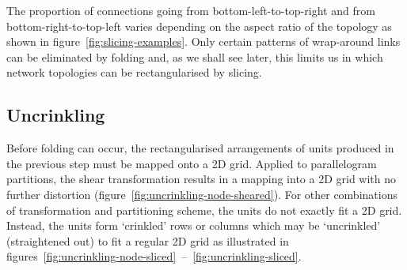 			The proportion of connections going from bottom-left-to-top-right and
			from bottom-right-to-top-left varies depending on the aspect ratio of the
			topology as shown in figure~\ref{fig:slicing-examples}. Only certain
			patterns of wrap-around links can be eliminated by folding and, as we
			shall see later, this limits us in which network topologies can be
			rectangularised by slicing.
			
		\subsection{Uncrinkling}
			
			Before folding can occur, the rectangularised arrangements of units
			produced in the previous step must be mapped onto a 2D grid. Applied to
			parallelogram partitions, the shear transformation results in a mapping
			into a 2D grid with no further distortion
			(figure~\ref{fig:uncrinkling-node-sheared}). For other combinations of
			transformation and partitioning scheme, the units do not exactly fit a 2D
			grid. Instead, the units form `crinkled' rows or columns which may be
			`uncrinkled' (straightened out) to fit a regular 2D grid as illustrated in
			figures~\ref{fig:uncrinkling-node-sliced}~--~\ref{fig:uncrinkling-sliced}.
			
